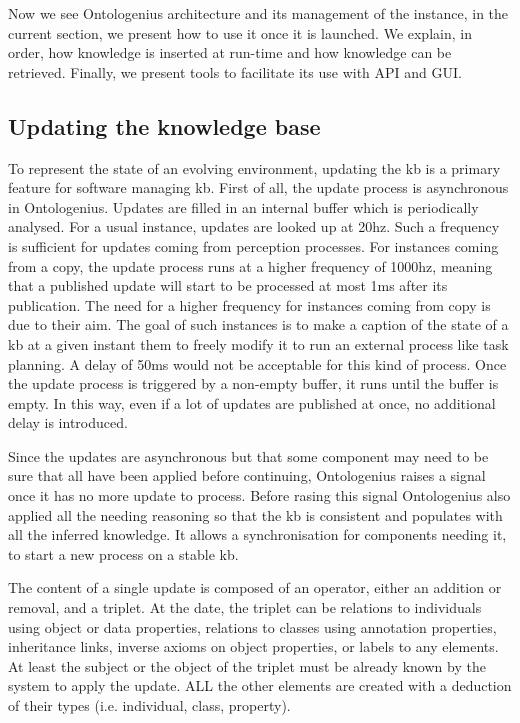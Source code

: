 Now we see Ontologenius architecture and its management of the instance, in the current section, we present how to use it once it is launched. We explain, in order, how knowledge is inserted at run-time and how knowledge can be retrieved. Finally, we present tools to facilitate its use with API and GUI.

\subsection{Updating the knowledge base}

To represent the state of an evolving environment, updating the \acrshort{kb} is a primary feature for software managing \acrshort{kb}. First of all, the update process is asynchronous in Ontologenius. Updates are filled in an internal buffer which is periodically analysed. For a usual instance, updates are looked up at 20hz. Such a frequency is sufficient for updates coming from perception processes. For instances coming from a copy, the update process runs at a higher frequency of 1000hz, meaning that a published update will start to be processed at most 1ms after its publication. The need for a higher frequency for instances coming from copy is due to their aim. The goal of such instances is to make a caption of the state of a \acrshort{kb} at a given instant them to freely modify it to run an external process like task planning. A delay of 50ms would not be acceptable for this kind of process. Once the update process is triggered by a non-empty buffer, it runs until the buffer is empty. In this way, even if a lot of updates are published at once, no additional delay is introduced.

Since the updates are asynchronous but that some component may need to be sure that all have been applied before continuing, Ontologenius raises a signal once it has no more update to process. Before rasing this signal Ontologenius also applied all the needing reasoning so that the \acrshort{kb} is consistent and populates with all the inferred knowledge. It allows a synchronisation for components needing it, to start a new process on a stable \acrshort{kb}.

The content of a single update is composed of an operator, either an addition or removal, and a triplet. At the date, the triplet can be relations to individuals using object or data properties, relations to classes using annotation properties, inheritance links, inverse axioms on object properties, or labels to any elements. At least the subject or the object of the triplet must be already known by the system to apply the update. ALL the other elements are created with a deduction of their types (i.e. individual, class, property).


